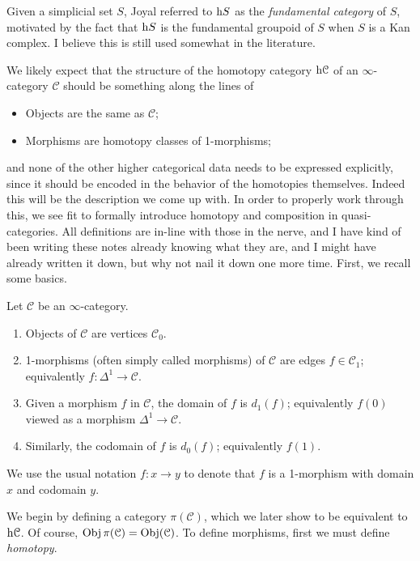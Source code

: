 Given a simplicial set $S$, Joyal referred to $\mathrm{h} S$ as the \emph{fundamental category} of $S$, motivated by the fact that $\mathrm{h} S$ is the fundamental groupoid of $S$ when $S$ is a Kan complex. I believe this is still used somewhat in the literature.

We likely expect that the structure of the homotopy category $\mathrm{h} \mathcal{C} $ of an $\infty $-category $\mathcal{C} $ should be something along the lines of
\begin{itemize}
	\item Objects are the same as $\mathcal{C} $;
	\item Morphisms are homotopy classes of 1-morphisms;
\end{itemize}
and none of the other higher categorical data needs to be expressed explicitly, since it should be encoded in the behavior of the homotopies themselves. Indeed this will be the description we come up with. In order to properly work through this, we see fit to formally introduce homotopy and composition in quasi-categories. All definitions are in-line with those in the nerve, and I have kind of been writing these notes already knowing what they are, and I might have already written it down, but why not nail it down one more time. First, we recall some basics.

\begin{definition}\label{1.2.3.3}
	Let $\mathcal{C} $ be an $\infty $-category.
	\begin{enumerate}
		\item Objects of $\mathcal{C} $ are vertices $\mathcal{C} _0$.
		\item 1-morphisms (often simply called morphisms) of $\mathcal{C} $ are edges $f\in \mathcal{C} _1$; equivalently $f : \Delta ^1 \to \mathcal{C} $.
		\item Given a morphism $f$ in $\mathcal{C} $, the domain of $f$ is $d_1(f)$; equivalently $f(0)$ viewed as a morphism $\Delta ^1\to \mathcal{C} $.
		\item Similarly, the codomain of $f$ is $d_0(f)$; equivalently $f(1)$.
	\end{enumerate}
	We use the usual notation $f : x \to y$ to denote that $f$ is a 1-morphism with domain $x$ and codomain $y$.
\end{definition}


We begin by defining a category $\pi (\mathcal{C} )$, which we later show to be equivalent to $\mathrm{h} \mathcal{C} $. Of course, $\operatorname{Obj} \pi (\mathcal{C} )=\operatorname{Obj}(\mathcal{C} ) $. To define morphisms, first we must define \emph{homotopy}.

